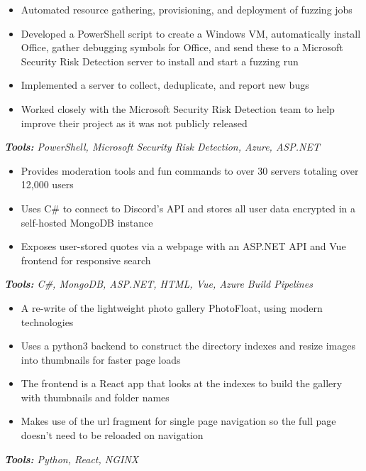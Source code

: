 \documentclass[10pt,a4paper]{altacv}
\begin{document}
\begin{itemize}
\item Automated resource gathering, provisioning, and deployment of fuzzing jobs
\item Developed a PowerShell script to create a Windows VM, automatically install Office, gather debugging symbols for Office, and send these to a Microsoft \\ Security Risk Detection server to install and start a fuzzing run
\item Implemented a server to collect, deduplicate, and report new bugs
\item Worked closely with the Microsoft Security Risk Detection team to help improve their project as it was not publicly released
\end{itemize}
\textit{\textbf{Tools:} PowerShell, Microsoft Security Risk Detection, Azure, ASP.NET}


\begin{itemize}
\item Provides moderation tools and fun commands to over 30 servers totaling over 12,000 users
\item Uses C\# to connect to Discord's API and stores all user data encrypted in a self-hosted MongoDB instance
\item Exposes user-stored quotes via a webpage with an ASP.NET API and Vue frontend for responsive search
\end{itemize}
\textit{\textbf{Tools:} C\#, MongoDB, ASP.NET, HTML, Vue, Azure Build Pipelines}

\divider

\begin{itemize}
\item A re-write of the lightweight photo gallery PhotoFloat, using modern technologies
\item Uses a python3 backend to construct the directory indexes and resize images into thumbnails for faster page loads
\item The frontend is a React app that looks at the indexes to build the gallery with thumbnails and folder names
\item Makes use of the url fragment for single page navigation so the full page doesn't need to be reloaded on navigation
\end{itemize}
\textit{\textbf{Tools:} Python, React, NGINX}
\end{document}
